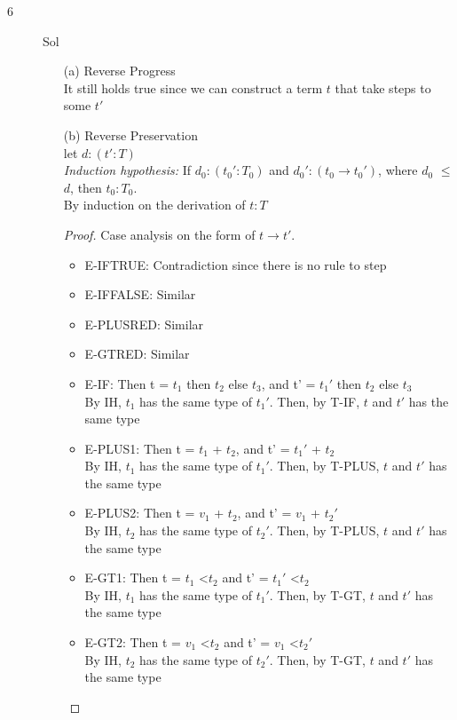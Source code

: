 \documentclass{article}
\begin{document}
\begin{description}
\begin{enumerate}
            \end{enumerate}
        \item[6]{Sol}
            \begin{enumerate}
                \item[(a)]{Reverse Progress}\\
                    It still holds true since we can construct a term $t$ that take steps to some $t'$
                \item[(b)]{Reverse Preservation}\\
                    let $d:(t':T)$\\
                    \textit{Induction hypothesis:} If $d_0:(t_0':T_0)$ and $d_0':(t_0 \rightarrow t_0')$, where $d_0$ $\leq$ $d$, then $t_0:T_0$.\\
                    By induction on the derivation of $t:T$
                    \begin{proof}
                        Case analysis on the form of $t \rightarrow t'$.
                        \begin{itemize}
                            \item E-IFTRUE: Contradiction since there is no rule to step
                            \item E-IFFALSE: Similar
                            \item E-PLUSRED: Similar
                            \item E-GTRED: Similar
                            \item E-IF: Then t = $t_1$ then $t_2$ else $t_3$, and t' = $t_1'$ then $t_2$ else $t_3$\\
                                By IH, $t_1$ has the same type of $t_1'$. Then, by T-IF, $t$ and $t'$ has the same type
                            \item E-PLUS1: Then t = $t_1$ + $t_2$, and t' = $t_1'$ + $t_2$\\
                                By IH, $t_1$ has the same type of $t_1'$. Then, by T-PLUS, $t$ and $t'$ has the same type
                            \item E-PLUS2: Then t = $v_1$ + $t_2$, and t' = $v_1$ + $t_2'$\\
                                By IH, $t_2$ has the same type of $t_2'$. Then, by T-PLUS, $t$ and $t'$ has the same type
                            \item E-GT1: Then t = $t_1$ \textless $t_2$ and t' = $t_1'$ \textless $t_2$\\
                                By IH, $t_1$ has the same type of $t_1'$. Then, by T-GT, $t$ and $t'$ has the same type
                            \item E-GT2: Then t = $v_1$ \textless $t_2$ and t' = $v_1$ \textless $t_2'$\\
                                By IH, $t_2$ has the same type of $t_2'$. Then, by T-GT, $t$ and $t'$ has the same type
                        \end{itemize}
                    \end{proof}


\end{enumerate}
\end{description}
\end{document}
